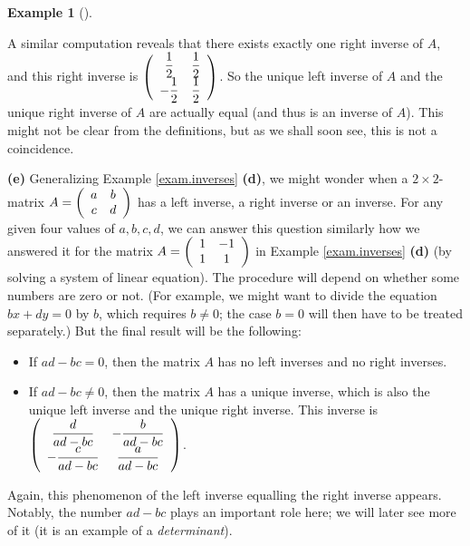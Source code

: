 \documentclass[numbers=enddot,12pt,final,onecolumn,notitlepage]{scrartcl}%
\theoremstyle{definition}
\newtheorem{exam}[theo]{Example}
\newenvironment{example}[1][]
{\begin{exam}[#1]\begin{leftbar}}
{\end{leftbar}\end{exam}}
\begin{document}
\begin{example}
A similar computation reveals that there exists exactly one right inverse of
$A$, and this right inverse is $\left(
\begin{array}
[c]{cc}%
\dfrac{1}{2} & \dfrac{1}{2}\\
-\dfrac{1}{2} & \dfrac{1}{2}%
\end{array}
\right)  $. So the unique left inverse of $A$ and the unique right inverse of
$A$ are actually equal (and thus is an inverse of $A$). This might not be
clear from the definitions, but as we shall soon see, this is not a coincidence.

\textbf{(e)} Generalizing Example \ref{exam.inverses} \textbf{(d)}, we might
wonder when a $2\times2$-matrix $A=\left(
\begin{array}
[c]{cc}%
a & b\\
c & d
\end{array}
\right)  $ has a left inverse, a right inverse or an inverse. For any given
four values of $a,b,c,d$, we can answer this question similarly how we
answered it for the matrix $A=\left(
\begin{array}
[c]{cc}%
1 & -1\\
1 & 1
\end{array}
\right)  $ in Example \ref{exam.inverses} \textbf{(d)} (by solving a system of
linear equation). The procedure will depend on whether some numbers are zero
or not. (For example, we might want to divide the equation $bx+dy=0$ by $b$,
which requires $b\neq0$; the case $b=0$ will then have to be treated
separately.) But the final result will be the following:

\begin{itemize}
\item If $ad-bc=0$, then the matrix $A$ has no left inverses and no right inverses.

\item If $ad-bc\neq0$, then the matrix $A$ has a unique inverse, which is also
the unique left inverse and the unique right inverse. This inverse is $\left(
%
\begin{array}
[c]{cc}%
\dfrac{d}{ad-bc} & -\dfrac{b}{ad-bc}\\
-\dfrac{c}{ad-bc} & \dfrac{a}{ad-bc}%
\end{array}
\right)  $.
\end{itemize}

Again, this phenomenon of the left inverse equalling the right inverse
appears. Notably, the number $ad-bc$ plays an important role here; we will
later see more of it (it is an example of a \textit{determinant}).
\end{example}
\end{document}
